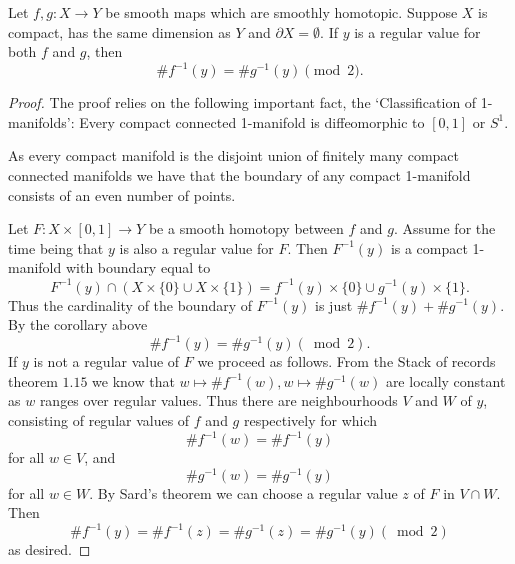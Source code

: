 \documentclass[a4paper, 10pt, twocolumn]{amsart}
\begin{document}
\begin{lemma}
    Let $f, g: X \rightarrow Y$ be smooth maps which are smoothly homotopic. Suppose $X$ is compact, has the same dimension as $Y$ and $\partial X=\emptyset$. If $y$ is a regular value for both $f$ and $g$, then
$$
\# f^{-1}(y)=\# g^{-1}(y) \pmod{2}.
$$
\end{lemma}
\begin{proof}
The proof relies on the following important fact, the `Classification of 1-manifolds': Every compact connected 1-manifold is diffeomorphic to $[0,1]$ or $S^{1}$.

As every compact manifold is the disjoint union of finitely many compact connected manifolds we have that the boundary of any compact 1-manifold consists of an even number of points.

Let $F: X \times[0,1] \rightarrow Y$ be a smooth homotopy between $f$ and $g$. Assume for the time being that $y$ is also a regular value for $F$. Then $F^{-1}(y)$ is a compact 1-manifold with boundary equal to
$$
F^{-1}(y) \cap(X \times\{0\} \cup X \times\{1\})=f^{-1}(y) \times\{0\} \cup g^{-1}(y) \times\{1\}.
$$
Thus the cardinality of the boundary of $F^{-1}(y)$ is just $\# f^{-1}(y)+\# g^{-1}(y)$. By the corollary above
$$
\# f^{-1}(y)=\# g^{-1}(y)(\bmod 2).
$$
If $y$ is not a regular value of $F$ we proceed as follows. From the Stack of records theorem $1.15$ we know that $w \mapsto \# f^{-1}(w), w \mapsto \# g^{-1}(w)$ are locally constant as $w$ ranges over regular values. Thus there are neighbourhoods $V$ and $W$ of $y$, consisting of regular values of $f$ and $g$ respectively for which
$$
\# f^{-1}(w)=\# f^{-1}(y)
$$
for all $w \in V$, and
$$
\# g^{-1}(w)=\# g^{-1}(y)
$$
for all $w \in W$. By Sard's theorem we can choose a regular value $z$ of $F$ in $V \cap W$. Then
$$
\# f^{-1}(y)=\# f^{-1}(z)=\# g^{-1}(z)=\# g^{-1}(y)(\bmod 2)
$$
as desired.
\end{proof}
\end{document}
